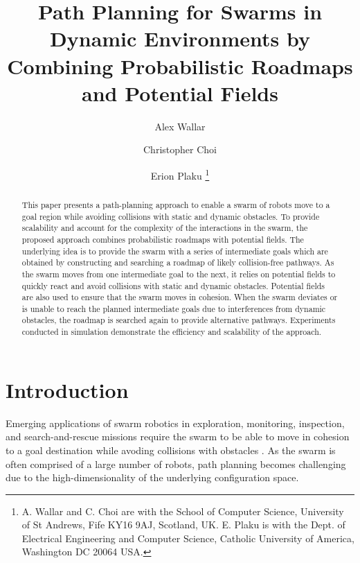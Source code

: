 \documentclass[letterpaper, 10pt, conference]{ieeeconf}
\begin{document}
\title{Path Planning for Swarms in Dynamic Environments by\\ Combining Probabilistic Roadmaps and
  Potential Fields}


\author{Alex Wallar \and Christopher Choi \and Erion Plaku
\thanks{A. Wallar and C. Choi are with the School of Computer Science,
  University of St Andrews, Fife KY16 9AJ, Scotland, UK. E. Plaku is with the
  Dept. of Electrical Engineering and Computer Science, Catholic
  University of America, Washington DC 20064 USA.
}}


\maketitle
\begin{abstract}
This paper presents a path-planning approach to enable a swarm of
robots move to a goal region while avoiding collisions with static and
dynamic obstacles.  To provide scalability and account for the
complexity of the interactions in the swarm, the proposed approach
combines probabilistic roadmaps with potential fields.  The underlying
idea is to provide the swarm with a series of intermediate goals which
are obtained by constructing and searching a roadmap of likely
collision-free pathways. As the swarm moves from one intermediate goal
to the next, it relies on potential fields to quickly react and avoid
collisions with static and dynamic obstacles. Potential fields are
also used to ensure that the swarm moves in cohesion. When the swarm
deviates or is unable to reach the planned intermediate goals due to
interferences from dynamic obstacles, the roadmap is searched again to
provide alternative pathways. Experiments conducted in simulation
demonstrate the efficiency and scalability of the approach.
\end{abstract}


\section{Introduction}
\label{sec:Intro}

Emerging applications of swarm robotics in exploration, monitoring,
inspection, and search-and-rescue missions require the swarm to be
able to move in cohesion to a goal destination while avoding
collisions with obstacles \cite{swarm,swarmReview12}.  As the swarm is
often comprised of a large number of robots, path planning becomes
challenging due to the high-dimensionality of the underlying
configuration space.
\end{document}
